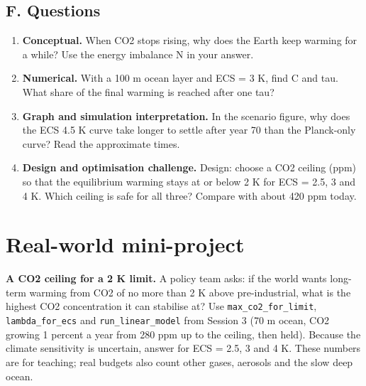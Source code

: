 \documentclass[11pt,a4paper]{article}
\begin{document}
\subsection*{F. Questions}
\begin{enumerate}[nosep]
\item \textbf{Conceptual.} When CO2 stops rising, why does the Earth keep warming for a while? Use the energy imbalance N in your answer.
\item \textbf{Numerical.} With a 100 m ocean layer and ECS = 3 K, find C and tau. What share of the final warming is reached after one tau?
\item \textbf{Graph and simulation interpretation.} In the scenario figure, why does the ECS 4.5 K curve take longer to settle after year 70 than the Planck-only curve? Read the approximate times.
\item \textbf{Design and optimisation challenge.} Design: choose a CO2 ceiling (ppm) so that the equilibrium warming stays at or below 2 K for ECS = 2.5, 3 and 4 K. Which ceiling is safe for all three? Compare with about 420 ppm today.
\end{enumerate}

\section{Real-world mini-project}
\textbf{A CO2 ceiling for a 2 K limit.} A policy team asks: if the world wants long-term warming from CO2 of no more than 2 K above pre-industrial, what is the highest CO2 concentration it can stabilise at? Use \texttt{max\_co2\_for\_limit}, \texttt{lambda\_for\_ecs} and \texttt{run\_linear\_model} from Session 3 (70 m ocean, CO2 growing 1 percent a year from 280 ppm up to the ceiling, then held). Because the climate sensitivity is uncertain, answer for ECS = 2.5, 3 and 4 K. These numbers are for teaching; real budgets also count other gases, aerosols and the slow deep ocean.
\end{document}
